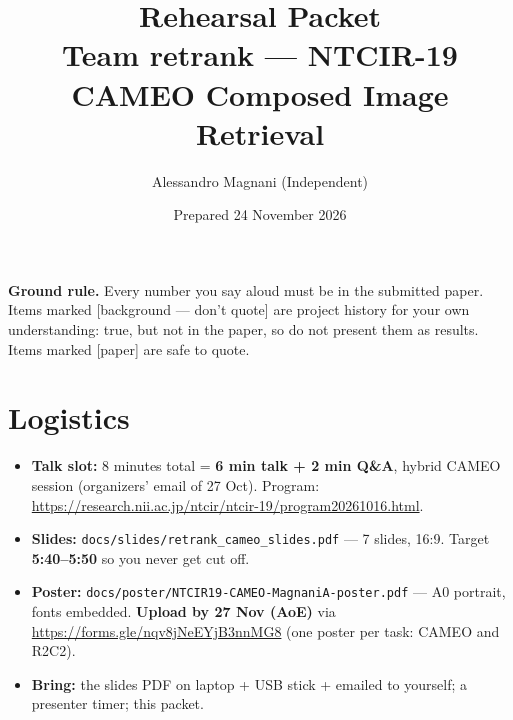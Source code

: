 \documentclass[11pt]{article}
\title{\textbf{Rehearsal Packet}\\[2pt]\large Team retrank --- NTCIR-19 CAMEO Composed Image Retrieval}
\author{Alessandro Magnani (Independent)}
\date{Prepared 24 November 2026}
\newcommand{\inpaper}{\textcolor{accent}{\small[paper]}}
\newcommand{\bg}{\textcolor{black!55}{\small[background --- don't quote]}}
\begin{document}
\maketitle
\tableofcontents
\bigskip

\begin{caution}
\textbf{Ground rule.} Every number you say aloud must be in the submitted paper.
Items marked \bg{} are project history for your own understanding: true, but not in
the paper, so do not present them as results. Items marked \inpaper{} are safe to quote.
\end{caution}

\section{Logistics}
\begin{itemize}
  \item \textbf{Talk slot:} 8 minutes total = \textbf{6 min talk + 2 min Q\&A}, hybrid CAMEO
        session (organizers' email of 27 Oct). Program:
        \url{https://research.nii.ac.jp/ntcir/ntcir-19/program20261016.html}.
  \item \textbf{Slides:} \texttt{docs/slides/retrank\_cameo\_slides.pdf} --- 7 slides, 16:9.
        Target \textbf{5:40--5:50} so you never get cut off.
  \item \textbf{Poster:} \texttt{docs/poster/NTCIR19-CAMEO-MagnaniA-poster.pdf} --- A0 portrait,
        fonts embedded. \textbf{Upload by 27 Nov (AoE)} via
        \url{https://forms.gle/nqv8jNeEYjB3nnMG8} (one poster per task: CAMEO and R2C2).
  \item \textbf{Bring:} the slides PDF on laptop + USB stick + emailed to yourself; a
        presenter timer; this packet.
\end{itemize}

\end{document}

